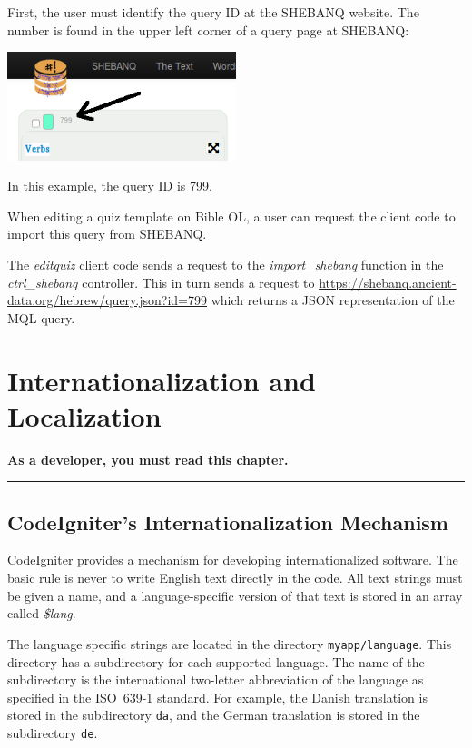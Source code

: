 \documentclass[11pt,oneside,a4paper]{memoir}
\begin{document}
First, the user must identify the query ID at the SHEBANQ website. The number is found in the
upper left corner of a query page at SHEBANQ:

\begin{center}
  \includegraphics[width=0.5\textwidth]{shebanq.png}
\end{center}

In this example, the query ID is 799.

When editing a quiz template on Bible OL, a user can request the client code to import this query
from SHEBANQ.

The \emph{editquiz} client code sends a request to the \emph{import\_shebanq} function in the
\emph{ctrl\_shebanq} controller. This in turn sends a request to
\url{https://shebanq.ancient-data.org/hebrew/query.json?id=799} which returns a JSON representation
of the MQL query.


\chapter{Internationalization and Localization}\label{chap-localize}

\textbf{As a developer, you must read this chapter.}

\plainbreak{3}

\section{CodeIgniter's Internationalization Mechanism}

CodeIgniter provides a mechanism for developing internationalized software. The basic rule is never
to write English text directly in the code. All text strings must be given a name, and a
language-specific version of that text is stored in an array called \emph{\$lang}.

The language specific strings are located in the directory \texttt{myapp/language}. This directory
has a subdirectory for each supported language. The name of the subdirectory is the international
two-letter abbreviation of the language as specified in the ISO~639-1 standard. For example, the
Danish translation is stored in the subdirectory \texttt{da}, and the German translation is stored
in the subdirectory \texttt{de}.
\end{document}
